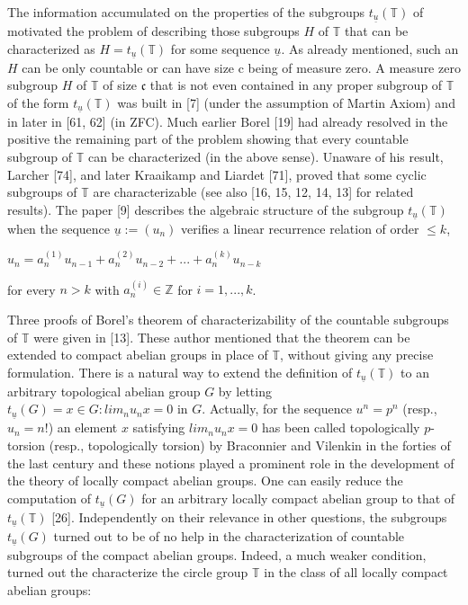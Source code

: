 \documentclass[12pt]{article}
\begin{document}
\begin{itemize}
\begin{itemize}
    The information accumulated on the properties of the subgroups $t_{\underline{u}}(\mathbb{T})$ of {} motivated the problem of
describing those subgroups $H$ of $\mathbb{T}$ that can be characterized as $H = t_{\underline{u}}(\mathbb{T})$ for some sequence $\underline{u}$. As already
mentioned, such an $H$ can be only countable or can have size c being of measure zero. A measure zero subgroup
$H$ of $\mathbb{T}$ of size $\mathfrak{c}$ that is not even contained in any proper subgroup of $\mathbb{T}$ of the form $t_{\underline{u}}(\mathbb{T})$ was built in [7]
(under the assumption of Martin Axiom) and in later in [61, 62] (in ZFC). Much earlier Borel [19] had already
resolved in the positive the remaining part of the problem showing that every countable subgroup of $\mathbb{T}$ can be
characterized (in the above sense). Unaware of his result, Larcher [74], and later Kraaikamp and Liardet [71],
proved that some cyclic subgroups of $\mathbb{T}$ are characterizable (see also [16, 15, 12, 14, 13] for related results). The
paper [9] describes the algebraic structure of the subgroup $t_{\underline{u}}(\mathbb{T})$ when the sequence $\underline{u} := (u_n)$ verifies a linear
recurrence relation of order $\leq k$,


    $u_n = a^{(1)}_n u_{n-1} + a^{(2)}_n u_{n-2} + . . . + a^{(k)}_n u_{n-k}$


for every $n > k$ with $a^{(i)}_n \in \mathbb{Z}$ for $i = 1, . . . , k$.


    Three proofs of Borel's theorem of characterizability of the countable subgroups of $\mathbb{T}$ were given in [13]. These
author mentioned that the theorem can be extended to compact abelian groups in place of $\mathbb{T}$, without giving
any precise formulation. There is a natural way to extend the definition of $t_{\underline{u}}(\mathbb{T})$ to an arbitrary topological
abelian group $G$ by letting $t_{\underline{u}}(G) = {x \in G : lim_n u_n x = 0 \text{ in } G}$. Actually, for the sequence $u^n = p^n$ (resp.,
$u_n = n!$) an element $x$ satisfying $lim_n u_n x = 0$ has been called topologically $p$-torsion (resp., topologically torsion)
by Braconnier and Vilenkin in the forties of the last century and these notions played a prominent role in the
development of the theory of locally compact abelian groups. One can easily reduce the computation of $t_{\underline{u}}(G)$
for an arbitrary locally compact abelian group to that of $t_{\underline{u}}(\mathbb{T})$ [26]. Independently on their relevance in other
questions, the subgroups $t_{\underline{u}}(G)$ turned out to be of no help in the characterization of countable subgroups of
the compact abelian groups. Indeed, a much weaker condition, turned out the characterize the circle group $\mathbb{T}$
in the class of all locally compact abelian groups:
    


\end{itemize}
\end{itemize}
\end{document}
